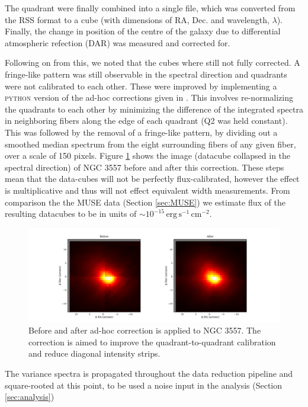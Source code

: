 		The quadrant were finally combined into a single file, which was converted from the RSS format to a cube (with dimensions of RA, Dec. and wavelength, $\lambda$). Finally, the change in position of the centre of the galaxy due to differential atmospheric refection (DAR) was measured and corrected for. 

		Following on from this, we noted that the cubes where still not fully corrected. A fringe-like pattern was still observable in the spectral direction and quadrants were not calibrated to each other. These were improved by implementing a \textsc{python} version of the ad-hoc corrections given in \citet{Lagerholm2012}. This involves re-normalizing the quadrants to each other by minimizing the difference of the integrated spectra in neighboring fibers along the edge of each quadrant (Q2 was held constant). This was followed by the removal of a fringe-like pattern, by dividing out a smoothed median spectrum from the eight surrounding fibers of any given fiber, over a scale of 150 pixels. Figure \ref{fig:Correction} shows the image (datacube collapsed in the spectral direction) of NGC 3557 before and after this correction. These steps mean that the data-cubes will not be perfectly flux-calibrated, however the effect is multiplicative and thus will not effect equivalent width measurements. From comparison the the MUSE data (Section \ref{sec:MUSE}) we estimate flux of the resulting datacubes to be in units of $\sim 10^{-15} \, \mathrm{erg\,s^{-1}\,cm^{-2}}$. 

		\begin{figure}
			\centering
			\includegraphics[width=.7\textwidth]{chapter2/ngc3557_corr_image.png}
			\caption[Affect of Ad-hoc Correction to VIMOS datacubes]{Before and after ad-hoc correction is applied to NGC 3557. The correction is aimed to improve the quadrant-to-quadrant calibration and reduce diagonal intensity strips. }
			\label{fig:Correction}
		\end{figure}



		

		The variance spectra is propagated throughout the data reduction pipeline and square-rooted at this point, to be used a noise input in the analysis (Section \ref{sec:analysis})

